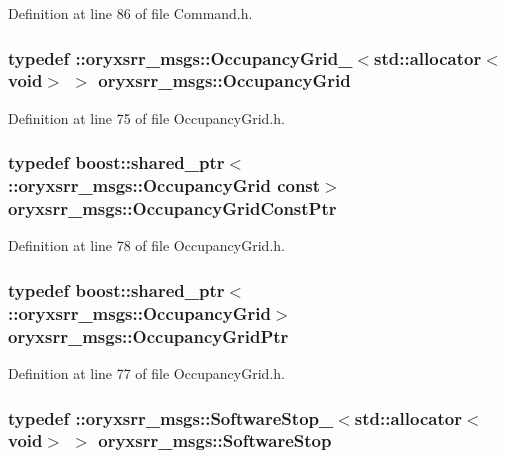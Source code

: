 \-Definition at line 86 of file \-Command.\-h.

\subsubsection[{\-Occupancy\-Grid}]{\setlength{\rightskip}{0pt plus 5cm}typedef \-::{\bf oryxsrr\-\_\-msgs\-::\-Occupancy\-Grid\-\_\-}$<$std\-::allocator$<$void$>$ $>$ {\bf oryxsrr\-\_\-msgs\-::\-Occupancy\-Grid}}\label{namespaceoryxsrr__msgs_ac9e31172fa1b8979cf718c6f7f917579}


\-Definition at line 75 of file \-Occupancy\-Grid.\-h.

\subsubsection[{\-Occupancy\-Grid\-Const\-Ptr}]{\setlength{\rightskip}{0pt plus 5cm}typedef boost\-::shared\-\_\-ptr$<$ \-::{\bf oryxsrr\-\_\-msgs\-::\-Occupancy\-Grid} const$>$ {\bf oryxsrr\-\_\-msgs\-::\-Occupancy\-Grid\-Const\-Ptr}}\label{namespaceoryxsrr__msgs_a5bad6d90db8a9c3a540247d6af963735}


\-Definition at line 78 of file \-Occupancy\-Grid.\-h.

\subsubsection[{\-Occupancy\-Grid\-Ptr}]{\setlength{\rightskip}{0pt plus 5cm}typedef boost\-::shared\-\_\-ptr$<$ \-::{\bf oryxsrr\-\_\-msgs\-::\-Occupancy\-Grid}$>$ {\bf oryxsrr\-\_\-msgs\-::\-Occupancy\-Grid\-Ptr}}\label{namespaceoryxsrr__msgs_a63e95832e364692e90be37b436d02585}


\-Definition at line 77 of file \-Occupancy\-Grid.\-h.

\subsubsection[{\-Software\-Stop}]{\setlength{\rightskip}{0pt plus 5cm}typedef \-::{\bf oryxsrr\-\_\-msgs\-::\-Software\-Stop\-\_\-}$<$std\-::allocator$<$void$>$ $>$ {\bf oryxsrr\-\_\-msgs\-::\-Software\-Stop}}\label{namespaceoryxsrr__msgs_afa481029ae98e2221c11d8abe5f6b2cc}


